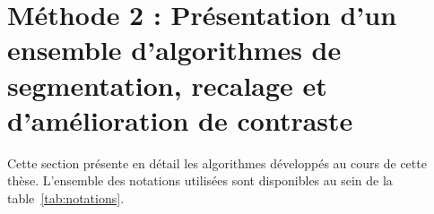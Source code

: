 \documentclass[\main/main.tex]{subfiles}
\begin{document}


\chapter{Méthode 2 : Présentation d'un ensemble d'algorithmes de segmentation, recalage et d'amélioration de contraste}

Cette section présente en détail les algorithmes développés au cours de cette thèse. L'ensemble des notations utilisées sont disponibles au sein de la table~\autoref{tab:notations}.










\end{document}
